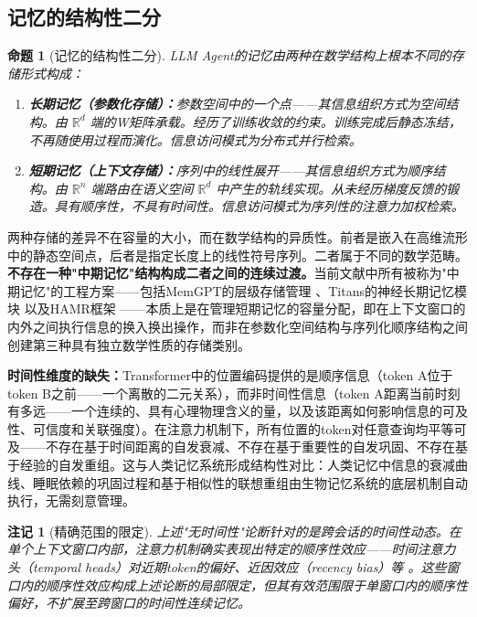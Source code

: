 \documentclass[11pt,a4paper]{article}
\newtheorem{proposition}[theorem]{命题}
\newtheorem{remark}[theorem]{注记}
\theoremstyle{definition}
\begin{document}
\subsection{记忆的结构性二分}
\label{sec:memory_dichotomy}

\begin{proposition}[记忆的结构性二分]
LLM Agent的记忆由两种在数学结构上根本不同的存储形式构成：
\begin{enumerate}[leftmargin=*,itemsep=0.3em]
    \item \textbf{长期记忆（参数化存储）：}参数空间中的一个点——其信息组织方式为空间结构。由 $\mathbb{R}^d$ 端的W矩阵承载。经历了训练收敛的约束。训练完成后静态冻结，不再随使用过程而演化。信息访问模式为分布式并行检索。
    \item \textbf{短期记忆（上下文存储）：}序列中的线性展开——其信息组织方式为顺序结构。由 $\mathbb{R}^n$ 端路由在语义空间 $\mathbb{R}^d$ 中产生的轨线实现。从未经历梯度反馈的锻造。具有顺序性，不具有时间性。信息访问模式为序列性的注意力加权检索。
\end{enumerate}
\end{proposition}

两种存储的差异不在容量的大小，而在数学结构的异质性。前者是嵌入在高维流形中的静态空间点，后者是指定长度上的线性符号序列。二者属于不同的数学范畴。\textbf{不存在一种"中期记忆"结构构成二者之间的连续过渡。}当前文献中所有被称为"中期记忆"的工程方案——包括MemGPT的层级存储管理 \cite{memgpt_2023}、Titans的神经长期记忆模块 \cite{titans_2024} 以及HAMR框架 \cite{hamr2024}——本质上是在管理短期记忆的容量分配，即在上下文窗口的内外之间执行信息的换入换出操作，而非在参数化空间结构与序列化顺序结构之间创建第三种具有独立数学性质的存储类别。

\textbf{时间性维度的缺失：}Transformer中的位置编码提供的是顺序信息（token A位于token B之前——一个离散的二元关系），而非时间性信息（token A距离当前时刻有多远——一个连续的、具有心理物理含义的量，以及该距离如何影响信息的可及性、可信度和关联强度）。在注意力机制下，所有位置的token对任意查询均平等可及——不存在基于时间距离的自发衰减、不存在基于重要性的自发巩固、不存在基于经验的自发重组。这与人类记忆系统形成结构性对比：人类记忆中信息的衰减曲线、睡眠依赖的巩固过程和基于相似性的联想重组由生物记忆系统的底层机制自动执行，无需刻意管理。

\begin{remark}[精确范围的限定]
上述"无时间性"论断针对的是跨会话的时间性动态。在单个上下文窗口内部，注意力机制确实表现出特定的顺序性效应——时间注意力头（temporal heads）对近期token的偏好、近因效应（recency bias）等 \cite{liu2023lost}。这些窗口内的顺序性效应构成上述论断的局部限定，但其有效范围限于单窗口内的顺序性偏好，不扩展至跨窗口的时间性连续记忆。
\end{remark}
\end{document}
